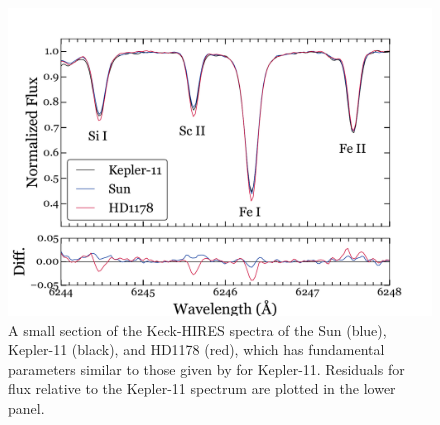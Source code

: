 \documentclass[oneside]{emulateapj}
\begin{document}
\begin{figure}
\centering
\includegraphics[width=\columnwidth]{spec}
\caption{A small section of the Keck-HIRES spectra of the Sun (blue), Kepler-11 (black), and HD1178 (red), which has fundamental parameters similar to those given by \citet{Lissauer2013} for Kepler-11. Residuals for flux relative to the Kepler-11 spectrum are plotted in the lower panel.}
\label{fig:spec}
\end{figure}
\end{document}
